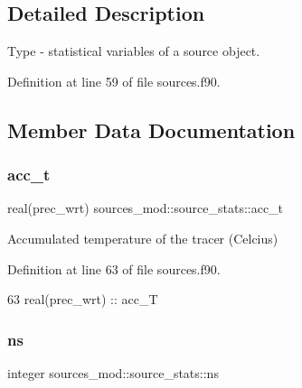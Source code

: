 \subsection{Detailed Description}
Type -\/ statistical variables of a source object. 

Definition at line 59 of file sources.\+f90.



\subsection{Member Data Documentation}
\mbox{\label{structsources__mod_1_1source__stats_a0b7d9fa17124a4e891bcfc00e39473e0}} 
\subsubsection{\texorpdfstring{acc\+\_\+t}{acc\_t}}
{\footnotesize\ttfamily real(prec\+\_\+wrt) sources\+\_\+mod\+::source\+\_\+stats\+::acc\+\_\+t\hspace{0.3cm}{\ttfamily [private]}}



Accumulated temperature of the tracer (Celcius) 



Definition at line 63 of file sources.\+f90.


\begin{DoxyCode}
63         \textcolor{keywordtype}{real(prec\_wrt)} :: acc\_T
\end{DoxyCode}
\mbox{\label{structsources__mod_1_1source__stats_a77ba33fcefa55c8d8e440844ee7f4640}} 
\subsubsection{\texorpdfstring{ns}{ns}}
{\footnotesize\ttfamily integer sources\+\_\+mod\+::source\+\_\+stats\+::ns\hspace{0.3cm}{\ttfamily [private]}}




